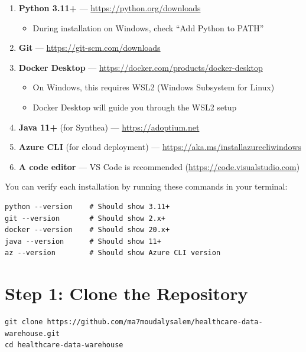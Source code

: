 \documentclass[12pt, a4paper, oneside]{report}
\begin{document}
\begin{enumerate}[label=\textcolor{primary}{\textbf{\arabic*.}}]
    \item \textbf{Python 3.11+} --- \url{https://python.org/downloads}
    \begin{itemize}
        \item During installation on Windows, check ``Add Python to PATH''
    \end{itemize}

    \item \textbf{Git} --- \url{https://git-scm.com/downloads}

    \item \textbf{Docker Desktop} --- \url{https://docker.com/products/docker-desktop}
    \begin{itemize}
        \item On Windows, this requires WSL2 (Windows Subsystem for Linux)
        \item Docker Desktop will guide you through the WSL2 setup
    \end{itemize}

    \item \textbf{Java 11+} (for Synthea) --- \url{https://adoptium.net}

    \item \textbf{Azure CLI} (for cloud deployment) --- \url{https://aka.ms/installazurecliwindows}

    \item \textbf{A code editor} --- VS Code is recommended (\url{https://code.visualstudio.com})
\end{enumerate}

\begin{tipbox}
    You can verify each installation by running these commands in your terminal:
    \begin{lstlisting}[style=bashstyle]
python --version    # Should show 3.11+
git --version       # Should show 2.x+
docker --version    # Should show 20.x+
java --version      # Should show 11+
az --version        # Should show Azure CLI version
    \end{lstlisting}
\end{tipbox}

\section{Step 1: Clone the Repository}

\begin{lstlisting}[style=bashstyle]
git clone https://github.com/ma7moudalysalem/healthcare-data-warehouse.git
cd healthcare-data-warehouse
\end{lstlisting}
\end{document}
